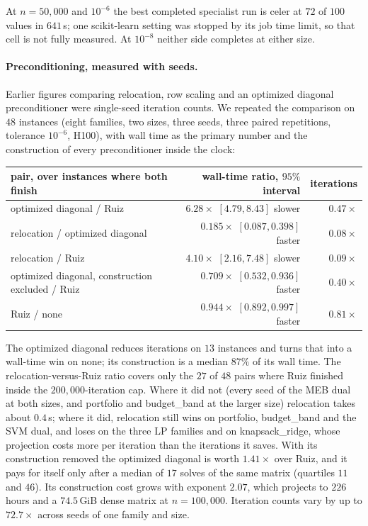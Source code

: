 \documentclass[11pt]{article}
\begin{document}
At $n = 50{,}000$ and $10^{-6}$ the best completed specialist run is celer at
$72$ of $100$ values in $641$\,s; one scikit-learn setting was stopped by its job
time limit, so that cell is not fully measured. At $10^{-8}$ neither side
completes at either size.

\paragraph{Preconditioning, measured with seeds.}
Earlier figures comparing relocation, row scaling and an optimized diagonal
preconditioner were single-seed iteration counts. We repeated the comparison on
$48$ instances (eight families, two sizes, three seeds, three paired
repetitions, tolerance $10^{-6}$, H100), with wall time as the primary number
and the construction of every preconditioner inside the clock:

\begin{center}
\small
\begin{tabular}{lrr}
\toprule
pair, over instances where both finish & wall-time ratio, $95\%$ interval & iterations \\
\midrule
optimized diagonal / Ruiz & $6.28\times$ $[4.79, 8.43]$ slower & $0.47\times$ \\
relocation / optimized diagonal & $0.185\times$ $[0.087, 0.398]$ faster & $0.08\times$ \\
relocation / Ruiz & $4.10\times$ $[2.16, 7.48]$ slower & $0.09\times$ \\
optimized diagonal, construction excluded / Ruiz & $0.709\times$ $[0.532, 0.936]$ faster & $0.40\times$ \\
Ruiz / none & $0.944\times$ $[0.892, 0.997]$ faster & $0.81\times$ \\
\bottomrule
\end{tabular}
\end{center}

The optimized diagonal reduces iterations on $13$ instances and turns that
into a wall-time win on none; its construction is a median $87\%$ of its wall
time. The relocation-versus-Ruiz ratio covers only the $27$ of $48$ pairs where Ruiz
finished inside the $200{,}000$-iteration cap. Where it did not (every seed of
the MEB dual at both sizes, and portfolio and budget\_band at the larger size)
relocation takes about $0.4$\,s; where it did, relocation still wins on portfolio,
budget\_band and the SVM dual, and loses on the three LP families and on
knapsack\_ridge, whose projection costs more per iteration than the iterations
it saves. With
its construction removed the optimized diagonal is worth $1.41\times$ over Ruiz,
and it pays for itself only after a median of $17$ solves of the same matrix
(quartiles $11$ and $46$). Its construction cost grows with exponent $2.07$,
which projects to $226$ hours and a $74.5$\,GiB dense matrix at
$n = 100{,}000$. Iteration counts vary by up to $72.7\times$ across seeds of one
family and size.
\end{document}
